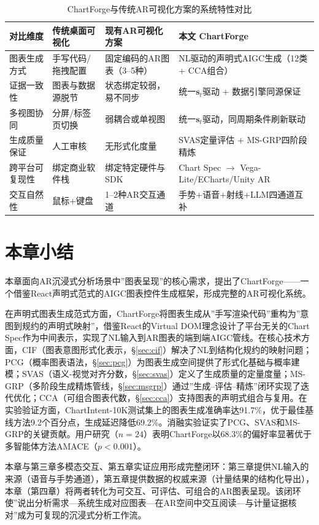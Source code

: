 \begin{table}[H]
\centering
\caption{ChartForge与传统AR可视化方案的系统特性对比}
\label{tab:ch4_system_compare}
\small
\begin{tabularx}{\linewidth}{p{2.8cm}XXX}
\hline
对比维度 & 传统桌面可视化 & 现有AR可视化方案 & 本文 ChartForge \\
\hline
图表生成方式 & 手写代码/拖拽配置 & 固定编码的AR图表（3--5种） & NL驱动的声明式AIGC生成（12类 + CCA组合） \\
证据一致性 & 图表与数据源脱节 & 状态绑定较弱，易不同步 & 统一$\mathbf{s}_t$驱动 + 数据引擎同源保证 \\
多视图协同 & 分屏/标签页切换  & 弱耦合或单视图       & 统一$\mathbf{s}_t$驱动，同周期条件刷新联动\\
生成质量保证 & 人工审核    & 无形式化度量        & SVAS定量评估 + MS-GRP四阶段精炼\\
跨平台可复现性 & 绑定商业软件栈 & 绑定特定硬件与SDK   & Chart Spec $\rightarrow$ Vega-Lite/ECharts/Unity AR\\
交互自然性  & 鼠标+键盘   & 1--2种AR交互通道   & 手势+语音+射线+LLM四通道互补\\
\hline
\end{tabularx}
\end{table}

\section{本章小结}
\label{sec:ch4_summary}

本章面向AR沉浸式分析场景中”图表呈现”的核心需求，提出了ChartForge——一个借鉴React声明式范式的AIGC图表控件生成框架，形成完整的AR可视化系统。

在声明式图表生成范式方面，ChartForge将图表生成从”手写渲染代码”重构为”意图到规约的声明式映射”，借鉴React的Virtual DOM理念设计了平台无关的Chart Spec作为中间表示，实现了NL输入到AR图表的端到端AIGC管线。在核心技术方面，CIF（图表意图形式化表示，\S\ref{sec:cif}）解决了NL到结构化规约的映射问题；PCG（概率图表语法，\S\ref{sec:pcg}）为图表生成空间提供了形式化基础与概率建模；SVAS（语义-视觉对齐分数，\S\ref{sec:svas}）定义了生成质量的定量度量；MS-GRP（多阶段生成精炼管线，\S\ref{sec:msgrp}）通过”生成--评估--精炼”闭环实现了迭代优化；CCA（可组合图表代数，\S\ref{sec:cca}）支持图表的声明式组合与复用。在实验验证方面，ChartIntent-10K测试集上的图表生成准确率达91.7\%，优于最佳基线方法9.2个百分点，生成延迟降低69.2\%。消融实验证实了PCG、SVAS和MS-GRP的关键贡献。用户研究（$n=24$）表明ChartForge以68.3\%的偏好率显著优于多智能体方法AMACE（$p < 0.001$）。

本章与第三章多模态交互、第五章实证应用形成完整闭环：第三章提供NL输入的来源（语音与手势通道），第五章提供数据的权威来源（计量结果的结构化导出），本章（第四章）将两者转化为可交互、可评估、可组合的AR图表呈现。该闭环使”说出分析需求—系统生成对应图表—在AR空间中交互阅读—与计量证据核对”成为可复现的沉浸式分析工作流。
